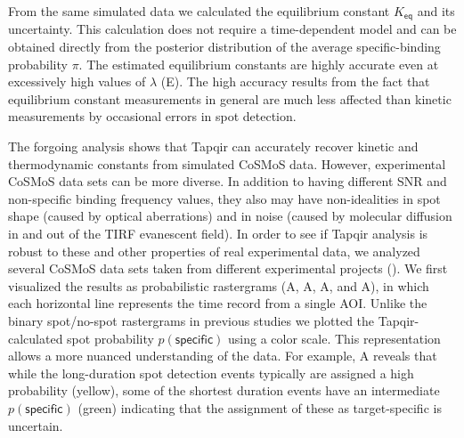 



From the same simulated data we calculated the equilibrium constant $K_\mathsf{eq}$ and its uncertainty. This calculation does not require a time-dependent model and can be obtained directly from the posterior distribution of the average specific-binding probability $\pi$. The estimated equilibrium constants are highly accurate even at excessively high values of $\lambda$ (E).  The high accuracy results from the fact that equilibrium constant measurements in general are much less affected than kinetic measurements by occasional errors in spot detection. 

The forgoing analysis shows that Tapqir can accurately recover kinetic and thermodynamic constants from simulated CoSMoS data.  However, experimental CoSMoS data sets can be more diverse.  In addition to having different SNR and non-specific binding frequency values, they also may have non-idealities in spot shape (caused by optical aberrations) and in noise (caused by molecular diffusion in and out of the TIRF evanescent field).  In order to see if Tapqir analysis is robust to these and other properties of real experimental data, we analyzed several CoSMoS data sets taken from different experimental projects (). We first visualized the results as probabilistic rastergrams (A, A, A, and A), in which each horizontal line represents the time record from a single AOI.  Unlike the binary spot/no-spot rastergrams in previous studies \citep{Friedman2013-sf,Rosen2020-zn} we plotted the Tapqir-calculated spot probability $p(\mathsf{specific})$ using a color scale.  This representation allows a more nuanced understanding of the data.  For example, A reveals that while the long-duration spot detection events typically are assigned a high probability (yellow), some of the shortest duration events have an intermediate $p(\mathsf{specific})$ (green) indicating that the assignment of these as target-specific is uncertain.  

